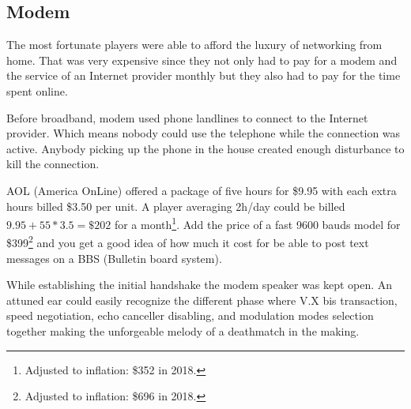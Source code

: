 \subsection{Modem}
The most fortunate players were able to afford the luxury of networking from home. That was very expensive since they not only had to pay for a modem and the service of an Internet provider monthly but they also had to pay for the time spent online.\\
\par 
Before broadband, modem used phone landlines to connect to the Internet provider. Which means nobody could use the telephone while the connection was active. Anybody picking up the phone in the house created enough disturbance to kill the connection.\\
\par
AOL (America OnLine) offered a package of five hours for \$9.95 with each extra hours billed \$3.50 per unit. A player averaging 2h/day could be billed $9.95 + 55 * 3.5 = \$202 $ for a month\footnote{Adjusted to inflation: \$352 in 2018.}. Add the price of a fast 9600 bauds model for \$399\footnote{Adjusted to inflation: \$696 in 2018.} and you get a good idea of how much it cost for be able to post text messages on a BBS (Bulletin board system).\\
\par
{}

 While establishing the initial handshake the modem speaker was kept open. An attuned ear could easily recognize the different phase where V.X bis transaction, speed negotiation, echo canceller disabling, and modulation modes selection together making the unforgeable melody of a deathmatch in the making.\\
 \par 
{}
\par
 
